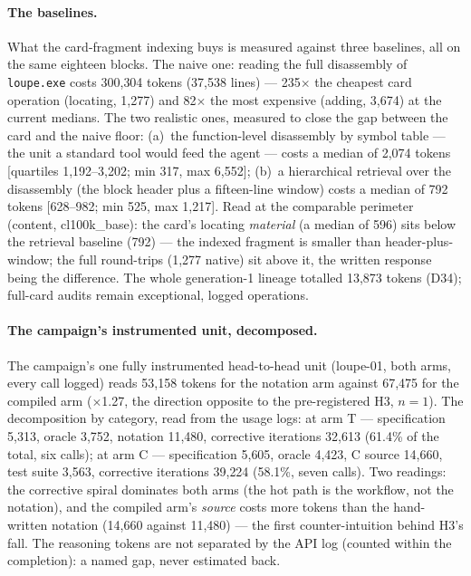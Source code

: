 \documentclass[11pt,a4paper]{article}
\newcommand{\code}[1]{\texttt{\small #1}}
\begin{document}
\paragraph{The baselines.}
What the card-fragment indexing buys is measured against three
baselines, all on the same eighteen blocks. The naive one: reading the
full disassembly of \code{loupe.exe} costs 300{,}304 tokens
(37{,}538 lines) --- 235$\times$ the cheapest card operation (locating,
1{,}277) and 82$\times$ the most expensive (adding, 3{,}674) at the
current medians. The two realistic ones, measured to close the gap
between the card and the naive floor: (a)~the function-level
disassembly by symbol table --- the unit a standard tool would feed the
agent --- costs a median of 2{,}074 tokens [quartiles 1{,}192--3{,}202;
min 317, max 6{,}552]; (b)~a hierarchical retrieval over the disassembly
(the block header plus a fifteen-line window) costs a median of 792
tokens [628--982; min 525, max 1{,}217]. Read at the comparable perimeter
(content, cl100k\_base): the card's locating \emph{material} (a median
of 596) sits below the retrieval baseline (792) --- the indexed fragment
is smaller than header-plus-window; the full round-trips (1{,}277 native)
sit above it, the written response being the difference. The whole
generation-1 lineage totalled 13{,}873 tokens (D34); full-card audits
remain exceptional, logged operations.

\paragraph{The campaign's instrumented unit, decomposed.}
The campaign's one fully instrumented head-to-head unit (loupe-01, both
arms, every call logged) reads 53{,}158 tokens for the notation arm
against 67{,}475 for the compiled arm ($\times$1.27, the direction
opposite to the pre-registered H3, $n{=}1$). The decomposition by
category, read from the usage logs: at arm T --- specification 5{,}313,
oracle 3{,}752, notation 11{,}480, corrective iterations 32{,}613
(61.4\% of the total, six calls); at arm C --- specification 5{,}605,
oracle 4{,}423, C source 14{,}660, test suite 3{,}563, corrective
iterations 39{,}224 (58.1\%, seven calls). Two readings: the corrective
spiral dominates both arms (the hot path is the workflow, not the
notation), and the compiled arm's \emph{source} costs more tokens than
the hand-written notation (14{,}660 against 11{,}480) --- the first
counter-intuition behind H3's fall. The reasoning tokens are not
separated by the API log (counted within the completion): a named gap,
never estimated back.
\end{document}
